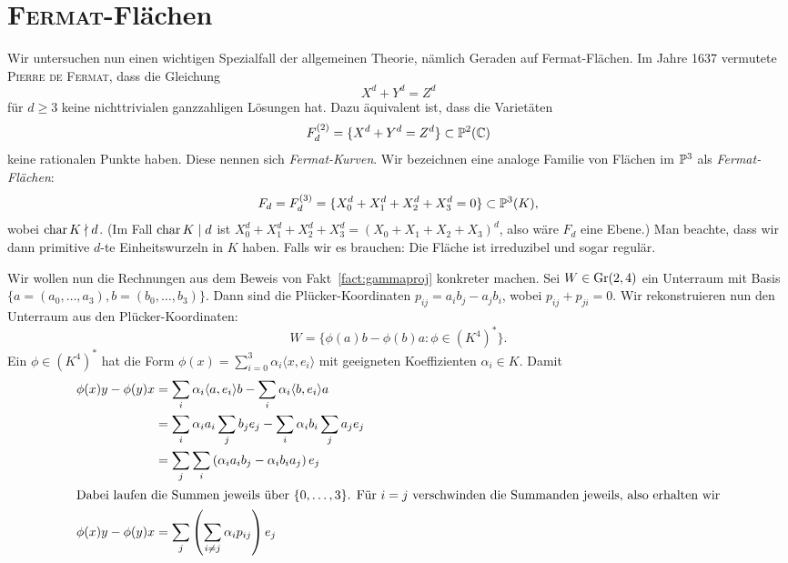 \chapter{\textsc{Fermat}-Flächen} \label{chap:fermat}
Wir untersuchen nun einen wichtigen Spezialfall der allgemeinen Theorie, nämlich Geraden auf Fermat-Flächen. Im Jahre 1637 vermutete \textsc{Pierre de Fermat}, dass die Gleichung
\begin{equation*}
X^d + Y^d = Z^d
\end{equation*}
für $d \geq 3$ keine nichttrivialen ganzzahligen Lösungen hat. Dazu äquivalent ist, dass die Varietäten
\begin{equation*}
F_d^{(2)} = \{ X^d + Y^d = Z^d \} \subset \mathbb P^{2}(\mathbb C)
\end{equation*}
keine rationalen Punkte haben. Diese nennen sich \emph{Fermat-Kurven}. Wir bezeichnen eine analoge Familie von Flächen im $\mathbb P^{3}$ als \emph{Fermat-Flächen}:
\begin{equation}
F_d = F_d^{(3)} = \{ X_0^d + X_1^d + X_2^d + X_3^d = 0 \} \subset \mathbb P^{3}(K),
\end{equation}
wobei $\operatorname{char} K \nmid d$. (Im Fall $\operatorname{char} K \mid d$ ist $X_0^d + X_1^d + X_2^d + X_3^d = (X_0 + X_1 + X_2 + X_3)^d$, also wäre $F_d$ eine Ebene.) Man beachte, dass wir dann primitive $d$-te Einheitswurzeln in $K$ haben.
\todo Falls wir es brauchen: Die Fläche ist irreduzibel und sogar regulär.

Wir wollen nun die Rechnungen aus dem Beweis von Fakt~\ref{fact:gammaproj} konkreter machen. Sei $W \in \grass 2/4$ ein Unterraum mit Basis $\{a = (a_0, \dots, a_3), b = (b_0, \dots, b_3)\}$. Dann sind die Plücker-Koordinaten $p_{ij} = a_i b_j - a_j b_i$, wobei $p_{ij} + p_{ji} = 0$. Wir rekonstruieren nun den Unterraum aus den Plücker-Koordinaten:
\begin{equation}
W = \{ \phi(a)b - \phi(b)a \colon \phi \in (K^4)^* \}.
\end{equation}
Ein $\phi \in (K^4)^*$ hat die Form $\phi(x) = \sum_{i=0}^3 \alpha_i \langle x, e_i \rangle$ mit geeigneten Koeffizienten $\alpha_i \in K$. Damit
\begin{align*}
\phi(x)y - \phi(y)x &= \sum_i \alpha_i \langle a, e_i \rangle b - \sum_i \alpha_i \langle b, e_i \rangle a \\
	&= \sum_i \alpha_i a_i \sum_j b_j e_j - \sum_i \alpha_i b_i \sum_j a_j e_j \\
	&= \sum_j \sum_i \left(\alpha_i a_i b_j - \alpha_i b_i a_j \right) e_j \\
\intertext{Dabei laufen die Summen jeweils über $\{0,\dots,3\}$. Für $i=j$ verschwinden die Summanden jeweils, also erhalten wir}
\phi(x)y - \phi(y)x &= \sum_j \left(\sum_{i \neq j} \alpha_i p_{ij} \right) e_j
\end{align*}


